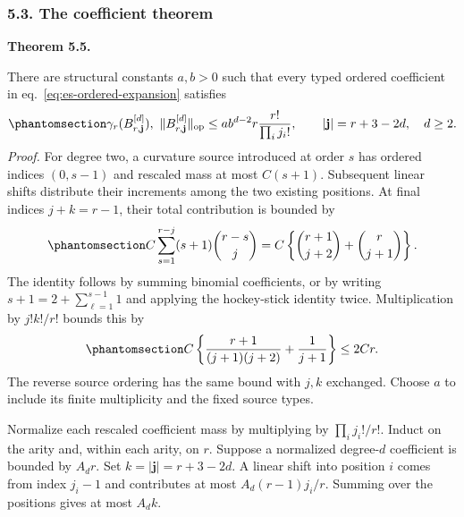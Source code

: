 \documentclass[
  english,
  11pt,
  reqno]{amsart}
\makeatletter
\newcommand{\pandocstatementheading}[1]{%
  \par\addpenalty{\@beginparpenalty}%
  \addvspace{.5\baselineskip plus .2\baselineskip minus .2\baselineskip}%
  {\normalfont\bfseries #1\par}%
  \nobreak\@afterindenttrue\@afterheading
}
\makeatother
\begin{document}
\subsubsection{5.3. The coefficient
theorem}\label{the-coefficient-theorem}
\leavevmode\par\nobreak

\pandocstatementheading{\protect{}\label{thm:es-coefficients}Theorem 5.5.}

There are structural constants \(a,b>0\) such that every typed ordered
coefficient in eq.~\ref{eq:es-ordered-expansion} satisfies
\begin{equation}\protect\phantomsection\label{eq:es-coefficient-budget}{
 \gamma_r(B^{[d]}_{r,\mathbf j}),\ 
 \|B^{[d]}_{r,\mathbf j}\|_{\mathrm{op}}
 \le ab^{d-2}r\frac{r!}{\prod_i j_i!},
 \qquad |\mathbf j|=r+3-2d,\quad d\ge2.
}\end{equation} \emph{Proof.} For degree two, a curvature source
introduced at order \(s\) has ordered indices \((0,s-1)\) and rescaled
mass at most \(C(s+1)\). Subsequent linear shifts distribute their
increments among the two existing positions. At final indices
\(j+k=r-1\), their total contribution is bounded by
\begin{equation}\protect\phantomsection\label{eq:es-quadratic-sum}{
 C\sum_{s=1}^{r-j}(s+1)\binom{r-s}{j}
 =C\left\{\binom{r+1}{j+2}+\binom r{j+1}\right\}.
}\end{equation} The identity follows by summing binomial coefficients,
or by writing \(s+1=2+\sum_{\ell=1}^{s-1}1\) and applying the
hockey-stick identity twice. Multiplication by \(j!k!/r!\) bounds this
by
\begin{equation}\protect\phantomsection\label{eq:es-quadratic-normalization}{
 C\left\{\frac{r+1}{(j+1)(j+2)}+\frac1{j+1}\right\}\le2Cr.
}\end{equation} The reverse source ordering has the same bound with
\(j,k\) exchanged. Choose \(a\) to include its finite multiplicity and
the fixed source types.

Normalize each rescaled coefficient mass by multiplying by
\(\prod_i j_i!/r!\). Induct on the arity and, within each arity, on
\(r\). Suppose a normalized degree-\(d\) coefficient is bounded by
\(A_dr\). Set \(k=|\mathbf j|=r+3-2d\). A linear shift into position
\(i\) comes from index \(j_i-1\) and contributes at most
\(A_d(r-1)j_i/r\). Summing over the positions gives at most \(A_dk\).
\end{document}
